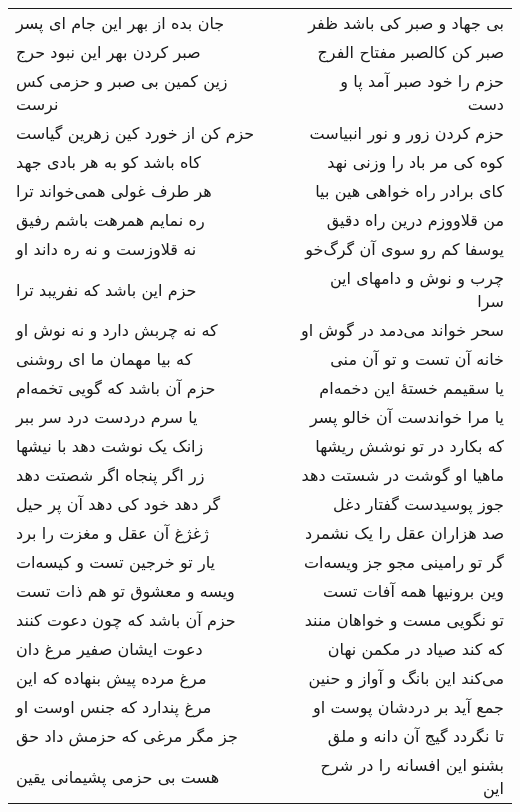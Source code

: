 \begin{center}
\begin{longtable}{l p{0.5cm} r}
جان بده از بهر این جام ای پسر
&&
بی جهاد و صبر کی باشد ظفر
\\
صبر کردن بهر این نبود حرج
&&
صبر کن کالصبر مفتاح الفرج
\\
زین کمین بی صبر و حزمی کس نرست
&&
حزم را خود صبر آمد پا و دست
\\
حزم کن از خورد کین زهرین گیاست
&&
حزم کردن زور و نور انبیاست
\\
کاه باشد کو به هر بادی جهد
&&
کوه کی مر باد را وزنی نهد
\\
هر طرف غولی همی‌خواند ترا
&&
کای برادر راه خواهی هین بیا
\\
ره نمایم همرهت باشم رفیق
&&
من قلاووزم درین راه دقیق
\\
نه قلاوزست و نه ره داند او
&&
یوسفا کم رو سوی آن گرگ‌خو
\\
حزم این باشد که نفریبد ترا
&&
چرب و نوش و دامهای این سرا
\\
که نه چربش دارد و نه نوش او
&&
سحر خواند می‌دمد در گوش او
\\
که بیا مهمان ما ای روشنی
&&
خانه آن تست و تو آن منی
\\
حزم آن باشد که گویی تخمه‌ام
&&
یا سقیمم خستهٔ این دخمه‌ام
\\
یا سرم دردست درد سر ببر
&&
یا مرا خواندست آن خالو پسر
\\
زانک یک نوشت دهد با نیشها
&&
که بکارد در تو نوشش ریشها
\\
زر اگر پنجاه اگر شصتت دهد
&&
ماهیا او گوشت در شستت دهد
\\
گر دهد خود کی دهد آن پر حیل
&&
جوز پوسیدست گفتار دغل
\\
ژغژغ آن عقل و مغزت را برد
&&
صد هزاران عقل را یک نشمرد
\\
یار تو خرجین تست و کیسه‌ات
&&
گر تو رامینی مجو جز ویسه‌ات
\\
ویسه و معشوق تو هم ذات تست
&&
وین برونیها همه آفات تست
\\
حزم آن باشد که چون دعوت کنند
&&
تو نگویی مست و خواهان منند
\\
دعوت ایشان صفیر مرغ دان
&&
که کند صیاد در مکمن نهان
\\
مرغ مرده پیش بنهاده که این
&&
می‌کند این بانگ و آواز و حنین
\\
مرغ پندارد که جنس اوست او
&&
جمع آید بر دردشان پوست او
\\
جز مگر مرغی که حزمش داد حق
&&
تا نگردد گیج آن دانه و ملق
\\
هست بی حزمی پشیمانی یقین
&&
بشنو این افسانه را در شرح این
\\
\end{longtable}
\end{center}
